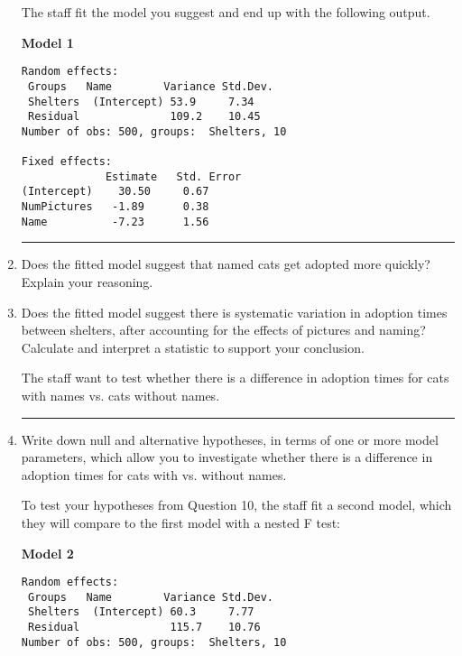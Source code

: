 \documentclass[11pt]{article}
\begin{document}
\begin{enumerate}
\pagebreak


The staff fit the model you suggest and end up with the following output. 

\textbf{Model 1} 

\begin{verbatim}
Random effects:
 Groups   Name        Variance Std.Dev.
 Shelters  (Intercept) 53.9     7.34  
 Residual              109.2    10.45  
Number of obs: 500, groups:  Shelters, 10

Fixed effects:
             Estimate   Std. Error 
(Intercept)    30.50     0.67      
NumPictures   -1.89      0.38  
Name          -7.23      1.56
\end{verbatim}

\rule{\textwidth}{1pt}

\item Does the fitted model suggest that named cats get adopted more quickly? Explain your reasoning.

\vspace{5cm} 

\item Does the fitted model suggest there is systematic variation in adoption times between shelters, after accounting for the effects of pictures and naming? Calculate and interpret a statistic to support your conclusion.


\pagebreak

The staff want to test whether there is a difference in adoption times for cats with names vs. cats without names.

\rule{\textwidth}{1pt}

\item Write down null and alternative hypotheses, in terms of one or more model parameters, which allow you to investigate whether there is a difference in adoption times for cats with vs. without names.

\vspace{4cm}

To test your hypotheses from Question 10, the staff fit a second model, which they will compare to the first model with a nested F test:

\textbf{Model 2} 

\begin{verbatim}
Random effects:
 Groups   Name        Variance Std.Dev.
 Shelters  (Intercept) 60.3     7.77
 Residual              115.7    10.76 
Number of obs: 500, groups:  Shelters, 10


\end{verbatim}
\end{enumerate}
\end{document}
